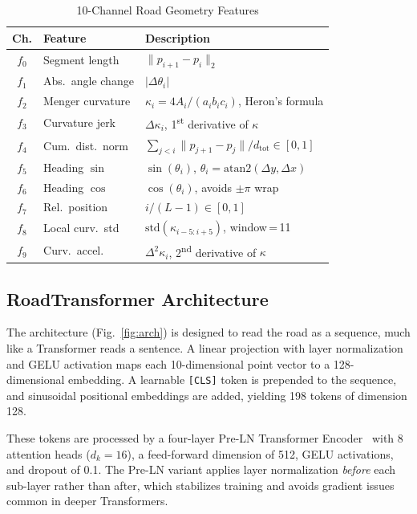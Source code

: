 ﻿\documentclass[conference]{IEEEtran}
\begin{document}
\begin{table}[t]
\caption{10-Channel Road Geometry Features}
\begin{center}
\setlength{\tabcolsep}{3pt}
{\small\begin{tabular}{cll}
\toprule
\textbf{Ch.} & \textbf{Feature} & \textbf{Description} \\
\midrule
$f_0$ & Segment length    & $\|p_{i+1}-p_i\|_2$ \\
$f_1$ & Abs.\ angle change & $|\Delta\theta_i|$ \\
$f_2$ & Menger curvature  & $\kappa_i=4A_i/(a_i b_i c_i)$, Heron's formula \\
$f_3$ & Curvature jerk    & $\Delta\kappa_i$, 1\textsuperscript{st} derivative of $\kappa$ \\
$f_4$ & Cum.\ dist.\ norm & $\textstyle\sum_{j<i}\!\|p_{j+1}{-}p_j\|/d_\text{tot}\in[0,1]$ \\
$f_5$ & Heading $\sin$    & $\sin(\theta_i)$, $\theta_i{=}\text{atan2}(\Delta y,\Delta x)$ \\
$f_6$ & Heading $\cos$    & $\cos(\theta_i)$, avoids $\pm\pi$ wrap \\
$f_7$ & Rel.\ position    & $i/(L{-}1)\in[0,1]$ \\
$f_8$ & Local curv.\ std  & $\text{std}(\kappa_{i-5{:}i+5})$, window\,=\,11 \\
$f_9$ & Curv.\ accel.     & $\Delta^2\kappa_i$, 2\textsuperscript{nd} derivative of $\kappa$ \\
\bottomrule
\end{tabular}}
\label{tab:features}
\end{center}
\end{table}


\subsection{RoadTransformer Architecture}

The architecture (Fig.~\ref{fig:arch}) is designed to read the road as a sequence, much like a Transformer reads a sentence. A linear projection with layer normalization and GELU activation maps each 10-dimensional point vector to a 128-dimensional embedding. A learnable \texttt{[CLS]} token is prepended to the sequence, and sinusoidal positional embeddings are added, yielding 198 tokens of dimension 128.

These tokens are processed by a four-layer Pre-LN Transformer Encoder~\cite{b11} with 8 attention heads ($d_k{=}16$), a feed-forward dimension of 512, GELU activations, and dropout of 0.1. The Pre-LN variant applies layer normalization \emph{before} each sub-layer rather than after, which stabilizes training and avoids gradient issues common in deeper Transformers.
\end{document}
